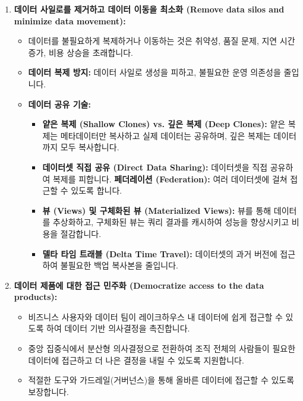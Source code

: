 \documentclass[11pt,a4paper]{article}
\theoremstyle{definition}
\begin{document}
\begin{enumerate}
    \item \textbf{데이터 사일로를 제거하고 데이터 이동을 최소화 (Remove data silos and minimize data movement):}
    \begin{itemize}
        \item 데이터를 불필요하게 복제하거나 이동하는 것은 취약성, 품질 문제, 지연 시간 증가, 비용 상승을 초래합니다.
        \item \textbf{데이터 복제 방지:} 데이터 사일로 생성을 피하고, 불필요한 운영 의존성을 줄입니다.
        \item \textbf{데이터 공유 기술:}
        \begin{itemize}
            \item \textbf{얕은 복제 (Shallow Clones) vs. 깊은 복제 (Deep Clones):} 얕은 복제는 메타데이터만 복사하고 실제 데이터는 공유하며, 깊은 복제는 데이터까지 모두 복사합니다.
            \item \textbf{데이터셋 직접 공유 (Direct Data Sharing):} 데이터셋을 직접 공유하여 복제를 피합니다.
            \textbf{페더레이션 (Federation):} 여러 데이터셋에 걸쳐 접근할 수 있도록 합니다.
            \item \textbf{뷰 (Views) 및 구체화된 뷰 (Materialized Views):} 뷰를 통해 데이터를 추상화하고, 구체화된 뷰는 쿼리 결과를 캐시하여 성능을 향상시키고 비용을 절감합니다.
            \item \textbf{델타 타임 트래블 (Delta Time Travel):} 데이터셋의 과거 버전에 접근하여 불필요한 백업 복사본을 줄입니다.
        \end{itemize}
    \end{itemize}

    \item \textbf{데이터 제품에 대한 접근 민주화 (Democratize access to the data products):}
    \begin{itemize}
        \item 비즈니스 사용자와 데이터 팀이 레이크하우스 내 데이터에 쉽게 접근할 수 있도록 하여 데이터 기반 의사결정을 촉진합니다.
        \item 중앙 집중식에서 분산형 의사결정으로 전환하여 조직 전체의 사람들이 필요한 데이터에 접근하고 더 나은 결정을 내릴 수 있도록 지원합니다.
        \item 적절한 도구와 가드레일(거버넌스)을 통해 올바른 데이터에 접근할 수 있도록 보장합니다.
    \end{itemize}


\end{enumerate}
\end{document}
